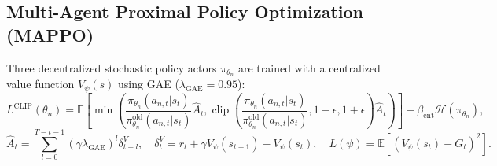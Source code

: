 \documentclass[journal,onecolumn]{IEEEtran}
\begin{document}
\subsection{Multi-Agent Proximal Policy Optimization (MAPPO)}
Three decentralized stochastic policy actors $\pi_{\theta_n}$ are trained with a centralized value function $V_\psi(s)$ using GAE ($\lambda_{\text{GAE}} = 0.95$):
\begin{equation}
    L^{\text{CLIP}}(\theta_n) = \mathbb{E}\left[ \min\left( \frac{\pi_{\theta_n}(a_{n,t}|s_t)}{\pi_{\theta_n}^{\text{old}}(a_{n,t}|s_t)} \widehat{A}_t, \operatorname{clip}\left( \frac{\pi_{\theta_n}(a_{n,t}|s_t)}{\pi_{\theta_n}^{\text{old}}(a_{n,t}|s_t)}, 1-\epsilon, 1+\epsilon \right) \widehat{A}_t \right) \right] + \beta_{\text{ent}} \mathcal{H}(\pi_{\theta_n}),
\end{equation}
\begin{equation}
    \widehat{A}_t = \sum_{l=0}^{T-t-1} (\gamma \lambda_{\text{GAE}})^l \delta_{t+l}^V, \quad \delta_t^V = r_t + \gamma V_\psi(s_{t+1}) - V_\psi(s_t), \quad
    L(\psi) = \mathbb{E}\left[ (V_\psi(s_t) - G_t)^2 \right].
\end{equation}
\end{document}
